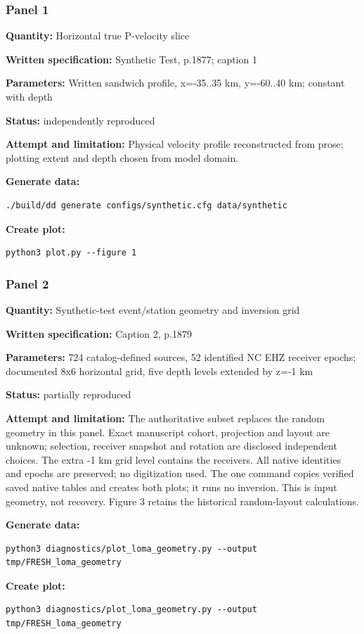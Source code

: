 \subsubsection*{Panel 1}
\noindent\textbf{Quantity:} Horizontal true P-velocity slice\par
\noindent\textbf{Written specification:} Synthetic Test, p.1877; caption 1\par
\noindent\textbf{Parameters:} Written sandwich profile, x=-35..35 km, y=-60..40 km; constant with depth\par
\noindent\textbf{Status:} independently reproduced\par
\noindent\textbf{Attempt and limitation:} Physical velocity profile reconstructed from prose; plotting extent and depth chosen from model domain.\par
\noindent\textbf{Generate data:}
\begin{lstlisting}
./build/dd generate configs/synthetic.cfg data/synthetic
\end{lstlisting}
\noindent\textbf{Create plot:}
\begin{lstlisting}
python3 plot.py --figure 1
\end{lstlisting}
\subsubsection*{Panel 2}
\noindent\textbf{Quantity:} Synthetic-test event/station geometry and inversion grid\par
\noindent\textbf{Written specification:} Caption 2, p.1879\par
\noindent\textbf{Parameters:} 724 catalog-defined sources, 52 identified NC EHZ receiver epochs; documented 8x6 horizontal grid, five depth levels extended by z=-1 km\par
\noindent\textbf{Status:} partially reproduced\par
\noindent\textbf{Attempt and limitation:} The authoritative subset replaces the random geometry in this panel. Exact manuscript cohort, projection and layout are unknown; selection, receiver snapshot and rotation are disclosed independent choices. The extra -1 km grid level contains the receivers. All native identities and epochs are preserved; no digitization used. The one command copies verified saved native tables and creates both plots; it runs no inversion. This is input geometry, not recovery. Figure 3 retains the historical random-layout calculations.\par
\noindent\textbf{Generate data:}
\begin{lstlisting}
python3 diagnostics/plot_loma_geometry.py --output tmp/FRESH_loma_geometry
\end{lstlisting}
\noindent\textbf{Create plot:}
\begin{lstlisting}
python3 diagnostics/plot_loma_geometry.py --output tmp/FRESH_loma_geometry
\end{lstlisting}
